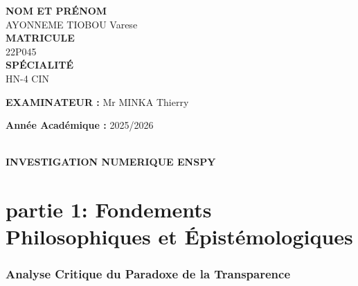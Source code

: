 \documentclass[12pt,a4paper]{article}
\begin{document}
\begin{titlepage}
\begin{center}
			\textbf{NOM ET PRÉNOM}\\
			AYONNEME TIOBOU Varese\\[0.1cm]
			\textbf{MATRICULE}\\
			22P045\\[0.1cm]
			\textbf{SPÉCIALITÉ}\\
			HN-4 CIN
		\end{center}
		
		\vspace{1cm}
		
		\begin{flushleft}
			\textbf{EXAMINATEUR :} Mr MINKA Thierry
		\end{flushleft}
		
		\begin{flushright}
			\textbf{Année Académique :} 2025/2026
		\end{flushright}
		
		\vfill
		
		\begin{center}
			\\[0.05cm]
			\textbf{\color{blueENSPY}INVESTIGATION NUMERIQUE \hspace{1cm}  \hspace{5cm} ENSPY}
		\end{center}
	\end{titlepage}
	
	\tableofcontents
	\pagebreak
	\part*{\centering partie 1: Fondements Philosophiques et Épistémologiques}
	\section{Analyse Critique du Paradoxe de la Transparence}
\end{document}
